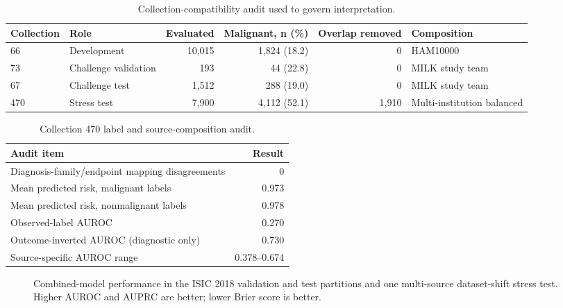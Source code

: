 \documentclass[11pt]{article}
\begin{document}
\begin{table}[H]
\centering
\caption{Collection-compatibility audit used to govern interpretation.}
\label{tab:compatibility}
\scriptsize
\begin{tabular}{p{}p{}rrrp{}}
\toprule
Collection & Role & Evaluated & Malignant, n (\%) & Overlap removed & Composition \\
\midrule
66 & Development & 10,015 & 1,824 (18.2) & 0 & HAM10000 \\
73 & Challenge validation & 193 & 44 (22.8) & 0 & MILK study team \\
67 & Challenge test & 1,512 & 288 (19.0) & 0 & MILK study team \\
470 & Stress test & 7,900 & 4,112 (52.1) & 1,910 & Multi-institution balanced \\
\bottomrule
\end{tabular}
\end{table}

\begin{table}[H]
\centering
\caption{Collection 470 label and source-composition audit.}
\label{tab:audit470}
\begin{tabular}{lr}
\toprule
Audit item & Result \\
\midrule
Diagnosis-family/endpoint mapping disagreements & 0 \\
Mean predicted risk, malignant labels & 0.973 \\
Mean predicted risk, nonmalignant labels & 0.978 \\
Observed-label AUROC & 0.270 \\
Outcome-inverted AUROC (diagnostic only) & 0.730 \\
Source-specific AUROC range & 0.378--0.674 \\
\bottomrule
\end{tabular}
\end{table}

\begin{figure}[H]
\centering
{}
\caption{Combined-model performance in the ISIC 2018 validation and test partitions and one multi-source dataset-shift stress test. Higher AUROC and AUPRC are better; lower Brier score is better.}
\label{fig:external}
\end{figure}
\end{document}
